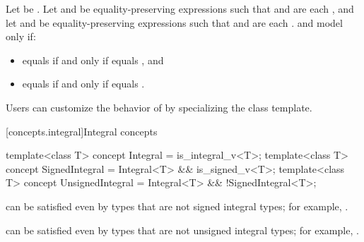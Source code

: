 \begin{itemdescr}
\pnum
Let  be .
Let  and  be
equality-preserving expressions such that
 and  are each , and
let  and  be equality-preserving expressions such that
 and  are each .
 and  model 
only if:
\begin{itemize}
\item {} equals  if and only if
   equals , and
\item {} equals  if and only if
   equals .
\end{itemize}

\pnum
\begin{note}
Users can customize the behavior of  by specializing the
 class template.
\end{note}

\end{itemdescr}

[concepts.integral]{Integral concepts}

%
%
%
\begin{itemdecl}
template<class T>
  concept Integral = is_integral_v<T>;
template<class T>
  concept SignedIntegral = Integral<T> && is_signed_v<T>;
template<class T>
  concept UnsignedIntegral = Integral<T> && !SignedIntegral<T>;
\end{itemdecl}

\begin{itemdescr}
\pnum
\begin{note}
 can be satisfied even by types that are
not signed integral types; for example, .
\end{note}

\pnum
\begin{note}
 can be satisfied even by types that are
not unsigned integral types; for example, .
\end{note}
\end{itemdescr}

